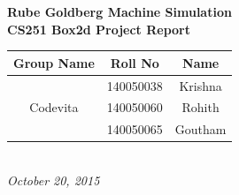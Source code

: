 \documentclass[a4paper]{article}
\begin{document}
	\centering
	\begin{titlepage}
	   \begin{center}
	      \LARGE \textbf{Rube Goldberg Machine Simulation \\ \vspace{10pt} CS251 Box2d Project Report }\\
	      \vspace{15mm}
			\large
	   		\begin{tabular}{ |c|c|c| }
	   			\hline
	    			Group Name & Roll No & Name \\
	   			\hline 
				 & 140050038 & Krishna \\ 	
	   			Codevita & 140050060 & Rohith \\ 
				 & 140050065 & Goutham \\ 
	   			\hline
	   		\end{tabular}
	   		\\ \vspace{15mm}
	   		\Large\textit{October 20, 2015}
	   	\end{center}
	\end{titlepage}
\end{document}
